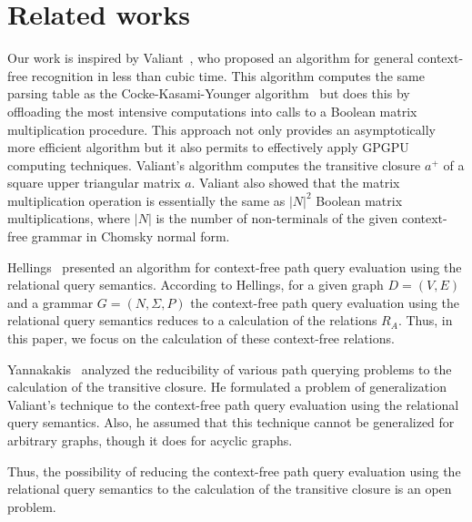 \section{Related works} \label{section_related}
Our work is inspired by Valiant~\cite{valiant}, who proposed an algorithm for general context-free recognition in less than cubic time. This algorithm computes the same parsing table as the Cocke-Kasami-Younger algorithm~\cite{kasami, younger} but does this by offloading the most intensive computations into calls to a Boolean matrix multiplication procedure. This approach not only provides an asymptotically more efficient algorithm but it also permits to effectively apply GPGPU computing techniques. Valiant's algorithm computes the transitive closure $a^+$ of a square upper triangular matrix $a$. Valiant also showed that the matrix multiplication operation is essentially the same as $|N|^2$ Boolean matrix multiplications, where $|N|$ is the number of non-terminals of the given context-free grammar in Chomsky normal form.

Hellings~\cite{hellingsRelational} presented an algorithm for context-free path query evaluation using the relational query semantics. According to Hellings, for a given graph $D = (V, E)$ and a grammar $G = (N, \Sigma, P)$ the context-free path query evaluation using the relational query semantics reduces to a calculation of the relations $R_A$. Thus, in this paper, we focus on the calculation of these context-free relations.

Yannakakis~\cite{transitive-closure} analyzed the reducibility of various path querying problems to the calculation of the transitive closure. He formulated a problem of generalization Valiant's technique to the context-free path query evaluation using the relational query semantics. Also, he assumed that this technique cannot be generalized for arbitrary graphs, though it does for acyclic graphs.

Thus, the possibility of reducing the context-free path query evaluation using the relational query semantics to the calculation of the transitive closure is an open problem.